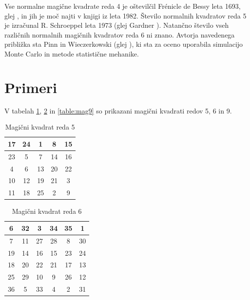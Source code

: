 \documentclass[a4paper,12pt]{article}
\theoremstyle{definition}
\theoremstyle{plain}
\begin{document}
Vse normalne magične kvadrate reda 4 je oštevilčil Frénicle de Bessy
leta 1693, glej \cite{bessy}, in jih je moč najti v knjigi \cite{berlekamp}
iz leta 1982. Število normalnih kvadratov reda 5 je izračunal
R. Schroeppel leta 1973 (glej Gardner \cite{gardner}).
Natančno število vseh različnih normalnih magičnih kvadratov reda 6 ni znano.
Avtorja navedenega približka sta Pinn in Wieczerkowski (glej \cite{pinn}), ki
sta za oceno uporabila simulacijo Monte Carlo in metode statistične mehanike.


\section{Primeri}

V tabelah \ref{table:mag5}, \ref{table:mag6} in \ref{table:mag9} so prikazani
magični kvadrati redov 5, 6 in 9. %

\begin{table}[!ht]
   \centering
   \caption{Magični kvadrat reda 5}
   \label{table:mag5}
   \begin{tabular}{|c|c|c|c|c|}
      \hline
      17 & 24 & 1 & 8 & 15 \\ \hline
      23 & 5 & 7 & 14 & 16 \\ \hline
      4 & 6 & 13 & 20 & 22 \\ \hline
      10 & 12 & 19 & 21 & 3 \\ \hline
      11 & 18 & 25 & 2 & 9 \\ \hline
   \end{tabular}
\end{table}

\begin{table}[!ht]
   \centering
   \caption{Magični kvadrat reda 6}
   \label{table:mag6}
   \begin{tabular}{|c|c|c|c|c|c|}
      \hline
      6 & 32 & 3 & 34 & 35 & 1 \\ \hline
      7 & 11 & 27 & 28 & 8 & 30 \\ \hline
      19 & 14 & 16 & 15 & 23 & 24 \\ \hline
      18 & 20 & 22 & 21 & 17 & 13 \\ \hline
      25 & 29 & 10 & 9 & 26 & 12 \\ \hline
      36 & 5 & 33 & 4 & 2 & 31 \\ \hline
   \end{tabular}
\end{table}
\end{document}

